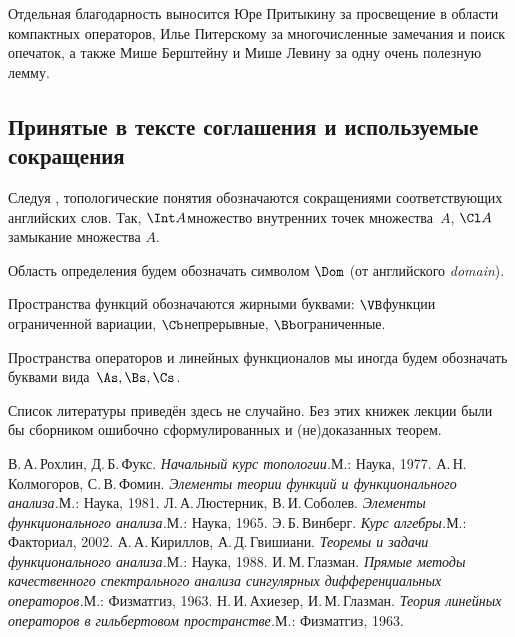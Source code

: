 \documentclass[a4paper]{article}
\begin{document}
Отдельная благодарность выносится Юре Притыкину за просвещение в области компактных операторов,
Илье Питерскому за многочисленные замечания и поиск опечаток, а также Мише Берштейну и Мише Левину
за одну очень полезную лемму.

\subsection*{Принятые в тексте соглашения и используемые сокращения}

\begin{points}{-3}
\item Следуя \cite{rokhlin}, топологические понятия обозначаются сокращениями соответствующих
      английских слов. Так, $\Int A$\т множество внутренних точек множества~$A$, $\Cl A$\т
      замыкание множества $A$.
\item Область определения будем обозначать символом $\Dom$ (от английского \emph{domain}).

\item Пространства функций обозначаются жирными буквами: $\VB$\т функции ограниченной вариации,
      $\Cb$\т непрерывные, $\Bb$\т ограниченные.
\item Пространства операторов и линейных функционалов мы иногда будем обозначать буквами
      вида~$\As, \Bs, \Cs$.
\end{points}

Список литературы приведён здесь не случайно. Без этих книжек лекции были бы сборником ошибочно
сформулированных и (не)доказанных теорем.

\begin{thebibliography}{4}
\setlength\itemsep{-.5mm}
    В.\,А.\,Рохлин, Д.\,Б.\,Фукс. \emph{Начальный курс топологии.}\т М.: Наука, 1977.
    А.\,Н.\,Колмогоров, С.\,В.\,Фомин. \emph{Элементы теории функций и функционального анализа.}\т М.: Наука, 1981.
    Л.\,А.\,Люстерник, В.\,И.\,Соболев. \emph{Элементы функционального анализа.}\т М.: Наука, 1965.
    Э.\,Б.\,Винберг. \emph{Курс алгебры.}\т М.: Факториал, 2002.
    А.\,А.\,Кириллов, А.\,Д.\,Гвишиани. \emph{Теоремы и задачи функционального анализа.}\т М.: Наука, 1988.
    И.\,М.\,Глазман. \emph{Прямые методы качественного спектрального анализа сингулярных
    дифференциальных операторов.}\т М.: Физматгиз, 1963.
    Н.\,И.\,Ахиезер, И.\,М.\,Глазман. \emph{Теория линейных операторов в гильбертовом пространстве.}\т М.: Физматгиз, 1963.
\end{thebibliography}
\end{document}
